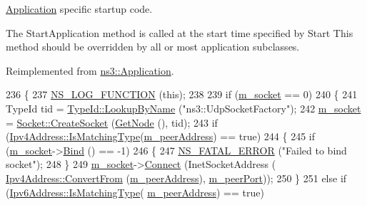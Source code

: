 \hyperlink{classns3_1_1Application}{Application} specific startup code. 

The Start\+Application method is called at the start time specified by Start This method should be overridden by all or most application subclasses. 

Reimplemented from \hyperlink{classns3_1_1Application_a3405dd01508beacce8ed6e3a20bdf05a}{ns3\+::\+Application}.


\begin{DoxyCode}
236 \{
237   \hyperlink{log-macros-disabled_8h_a90b90d5bad1f39cb1b64923ea94c0761}{NS\_LOG\_FUNCTION} (\textcolor{keyword}{this});
238 
239   \textcolor{keywordflow}{if} (\hyperlink{structns3_1_1UdpTraceClient_afdf8d1c4e4d20f4a378eb92ccf5a34d1}{m\_socket} == 0)
240     \{
241       TypeId tid = \hyperlink{classns3_1_1TypeId_a119cf99c20931fdc294602cd360b180e}{TypeId::LookupByName} (\textcolor{stringliteral}{"ns3::UdpSocketFactory"});
242       \hyperlink{structns3_1_1UdpTraceClient_afdf8d1c4e4d20f4a378eb92ccf5a34d1}{m\_socket} = \hyperlink{classns3_1_1Socket_ad448a62bb50ad3dbac59c879a885a8d2}{Socket::CreateSocket} (\hyperlink{classns3_1_1Application_a664b15088389bec8e35b35742138f097}{GetNode} (), tid);
243       \textcolor{keywordflow}{if} (\hyperlink{classns3_1_1Ipv4Address_a7129db5e08739783b300976d28c0ced3}{Ipv4Address::IsMatchingType}(\hyperlink{structns3_1_1UdpTraceClient_a23963b5603afc628e516eb1eccb14ad8}{m\_peerAddress}) == \textcolor{keyword}{true})
244         \{
245           \textcolor{keywordflow}{if} (\hyperlink{structns3_1_1UdpTraceClient_afdf8d1c4e4d20f4a378eb92ccf5a34d1}{m\_socket}->\hyperlink{classns3_1_1Socket_ada93439a43de2028b5a8fc6621dad482}{Bind} () == -1)
246             \{
247               \hyperlink{group__fatal_ga5131d5e3f75d7d4cbfd706ac456fdc85}{NS\_FATAL\_ERROR} (\textcolor{stringliteral}{"Failed to bind socket"});
248             \}
249           \hyperlink{structns3_1_1UdpTraceClient_afdf8d1c4e4d20f4a378eb92ccf5a34d1}{m\_socket}->\hyperlink{classns3_1_1Socket_a97f08aaf37b8fd7d4b5cad4dfdd4022a}{Connect} (InetSocketAddress (
      \hyperlink{classns3_1_1Ipv4Address_a5fd4a8f0f7bb75e35dad3d401ef4cbc1}{Ipv4Address::ConvertFrom} (\hyperlink{structns3_1_1UdpTraceClient_a23963b5603afc628e516eb1eccb14ad8}{m\_peerAddress}), 
      \hyperlink{structns3_1_1UdpTraceClient_a218996a58ca6cb1a17edd8df252596f5}{m\_peerPort}));
250         \}
251       \textcolor{keywordflow}{else} \textcolor{keywordflow}{if} (\hyperlink{classns3_1_1Ipv6Address_adbe329370b5a8f7c0f48659d6439dfd1}{Ipv6Address::IsMatchingType}(
      \hyperlink{structns3_1_1UdpTraceClient_a23963b5603afc628e516eb1eccb14ad8}{m\_peerAddress}) == \textcolor{keyword}{true})

\end{DoxyCode}

